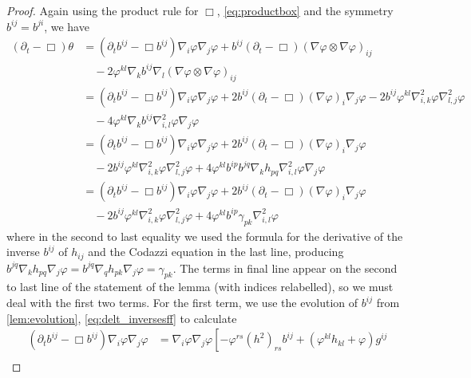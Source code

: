 \documentclass{amsart}
\begin{document}
\begin{proof}
Again using the product rule for \(\Box\), \cref{eq:productbox} and the symmetry \(b^{ij} = b^{ji}\), we have
\begin{equation}
\label{eq:delt_theta}
\begin{split}
(\partial_{t} - \Box)\theta &= (\partial_{t}b^{ij} - \Box b^{ij})\nabla_i \varphi\nabla_j\varphi + b^{ij} (\partial_{t} - \Box) (\nabla\varphi \otimes \nabla\varphi)_{ij} \\
&\quad - 2 \varphi^{kl} \nabla_k b^{ij} \nabla_l (\nabla \varphi \otimes \nabla\varphi)_{ij} \\
&= (\partial_{t}b^{ij} - \Box b^{ij})\nabla_i \varphi\nabla_j\varphi + 2 b^{ij} (\partial_{t} - \Box) (\nabla\varphi)_i \nabla_j\varphi - 2 b^{ij} \varphi^{kl} \nabla^2_{i,k} \varphi \nabla^2_{l,j} \varphi \\
&\quad - 4 \varphi^{kl} \nabla_k b^{ij} \nabla^2_{i,l} \varphi \nabla_j\varphi \\
&= (\partial_{t}b^{ij} - \Box b^{ij})\nabla_i \varphi\nabla_j\varphi + 2 b^{ij} (\partial_{t} - \Box) (\nabla\varphi)_i \nabla_j\varphi \\
&\quad - 2 b^{ij} \varphi^{kl} \nabla^2_{i,k} \varphi \nabla^2_{l,j} \varphi + 4 \varphi^{kl} b^{ip}b^{jq} \nabla_k h_{pq} \nabla^2_{i,l} \varphi \nabla_j\varphi \\
&= (\partial_{t}b^{ij} - \Box b^{ij})\nabla_i \varphi\nabla_j\varphi + 2 b^{ij} (\partial_{t} - \Box) (\nabla\varphi)_i \nabla_j\varphi \\ 
&\quad - 2 b^{ij} \varphi^{kl} \nabla^2_{i,k} \varphi \nabla^2_{l,j} \varphi + 4 \varphi^{kl} b^{ip}\gamma_{pk} \nabla^2_{i,l} \varphi
\end{split}
\end{equation}
where in the second to last equality we used the formula for the derivative of the inverse \(b^{ij}\) of \(h_{ij}\) and the Codazzi equation in the last line, producing \(b^{jq} \nabla_k h_{pq} \nabla_j \varphi = b^{jq} \nabla_q h_{pk} \nabla_j \varphi = \gamma_{pk}\). The terms in final line appear on the second to last line of the statement of the lemma (with indices relabelled), so we must deal with the first two terms. For the first term, we use the evolution of \(b^{ij}\) from \cref{lem:evolution}, \cref{eq:delt_inversesff} to calculate
\begin{equation}
\label{eq:delt_theta1}
\begin{split}
(\partial_{t}b^{ij} - \Box b^{ij})\nabla_i \varphi\nabla_j\varphi &= \nabla_i \varphi \nabla_j \varphi\left[-\varphi^{rs} (h^2)_{rs} b^{ij} + (\varphi^{kl}h_{kl} + \varphi) g^{ij} \right. \\

\end{split}
\end{equation}
\end{proof}
\end{document}
